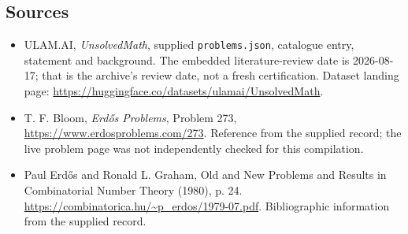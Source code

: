 \documentclass[11pt,a4paper]{article}
\begin{document}
\subsection{Sources}

{\small

\begin{itemize}

\item[\hypertarget{source:statement:1}{S1}] ULAM.AI, \emph{UnsolvedMath}, supplied \texttt{problems.json}, catalogue entry, statement and background. The embedded literature-review date is 2026-08-17; that is the archive’s review date, not a fresh certification. Dataset landing page: \url{https://huggingface.co/datasets/ulamai/UnsolvedMath}.

\item[\hypertarget{source:statement:2}{S2}] T. F. Bloom, \emph{Erdős Problems}, Problem 273, \url{https://www.erdosproblems.com/273}. Reference from the supplied record; the live problem page was not independently checked for this compilation.

\item[\hypertarget{source:statement:3}{S3}] Paul Erdős and Ronald L. Graham, Old and New Problems and Results in Combinatorial Number Theory (1980), p. 24. \url{https://combinatorica.hu/~p_erdos/1979-07.pdf}. Bibliographic information from the supplied record.

\end{itemize}

}

\label{end:statement}
\end{document}
